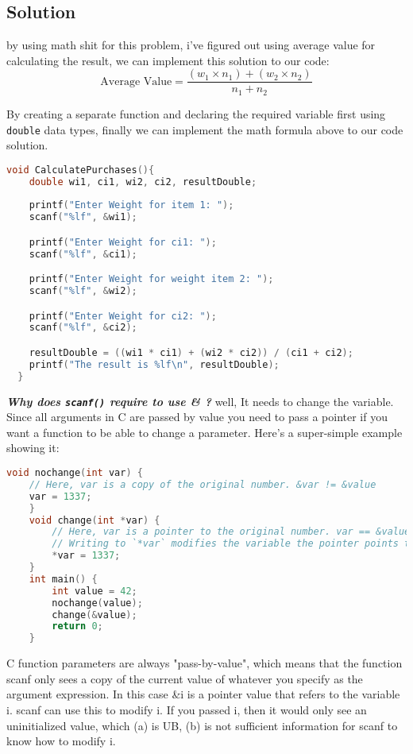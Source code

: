 \documentclass{article}
\begin{document}
  \subsection{Solution}
  by using math shit for this problem, i've figured out using average value for calculating the result, we can implement this solution to our code:
  \[
  \text{Average Value} = \frac{(w_1 \times n_1) + (w_2 \times n_2)}{n_1 + n_2}
  \]

  By creating a separate function and declaring the required variable first using \texttt{double} data types, finally we can implement the math formula above
  to our code solution.
  \begin{lstlisting}[language=C, caption=1.2 Code Solution]
  void CalculatePurchases(){
    double wi1, ci1, wi2, ci2, resultDouble;
    
    printf("Enter Weight for item 1: ");
    scanf("%lf", &wi1);

    printf("Enter Weight for ci1: ");
    scanf("%lf", &ci1);

    printf("Enter Weight for weight item 2: ");
    scanf("%lf", &wi2);

    printf("Enter Weight for ci2: ");
    scanf("%lf", &ci2);

    resultDouble = ((wi1 * ci1) + (wi2 * ci2)) / (ci1 + ci2);
    printf("The result is %lf\n", resultDouble);
  } 
  \end{lstlisting}
  \textbf{\textit{Why does \texttt{scanf()} require to use \& ?}} well, It needs to change the variable. Since all arguments in C are passed by value you need to pass a pointer if you want a function to be able to change a parameter.
  Here's a super-simple example showing it:
  \begin{lstlisting}[language=C, caption=1.3 scanf example]
    void nochange(int var) {
    // Here, var is a copy of the original number. &var != &value
    var = 1337;
    }
    void change(int *var) {
        // Here, var is a pointer to the original number. var == &value
        // Writing to `*var` modifies the variable the pointer points to
        *var = 1337;
    }
    int main() {
        int value = 42;
        nochange(value);
        change(&value);
        return 0;
    }
  \end{lstlisting}
  C function parameters are always "pass-by-value", which means that the function scanf only sees a copy of the current value of whatever you specify as the argument expression.
  In this case \&i is a pointer value that refers to the variable i. scanf can use this to modify i. If you passed i, then it would only see an uninitialized value, which (a) is UB, (b) is not sufficient information for scanf to know how to modify i.
\end{document}
